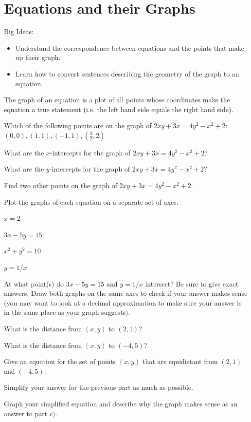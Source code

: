 \section{Equations and their Graphs}
Big Ideas:
\begin{itemize}
\item Understand the correspondence between equations and the points that make up their graph.
\item Learn how to convert sentences describing the geometry of the graph to an equation.
\end{itemize}

\begin{info} The graph of an equation is a plot of all points whose coordinates make the equation a true statement (i.e. the left hand side equals the right hand side). \end{info}

\bq Which of the following points are on the graph of $2xy+3x=4y^2-x^2+2$: $(0,0), (1,1), (-1,1), (\frac{3}{2},2)$
\eq

\bq What are the $x$-intercepts for the graph of $2xy+3x=4y^2-x^2+2$?
\eq

\bq What are the $y$-intercepts for the graph of $2xy+3x=4y^2-x^2+2$?
\eq

\bq Find two other points on the graph of $2xy+3x=4y^2-x^2+2$.
\eq

\bq Plot the graphs of each equation on a separate set of axes:
\be
\item $x=2$
\item $3x-5y=15$
\item $x^2+y^2=10$
\item $y=1/x$
\ee
\eq

\bq At what point(s) do $3x-5y=15$ and $y=1/x$ intersect? Be sure to give exact answers. Draw both graphs on the same axes to check if your answer makes sense (you may want to look at a decimal approximation to make sure your answer is in the same place as your graph suggests).
\eq

\bq
\be
\item What is the distance from $(x,y)$ to $(2,1)$?
\item What is the distance from $(x,y)$ to $(-4,5)$?
\item Give an equation for the set of points $(x,y)$ that are equidistant from $(2,1)$ and $(-4,5)$.
\item Simplify your answer for the previous part as much as possible.
\item Graph your simplified equation and describe why the graph makes sense as an answer to part $c)$.
\ee
\eq


